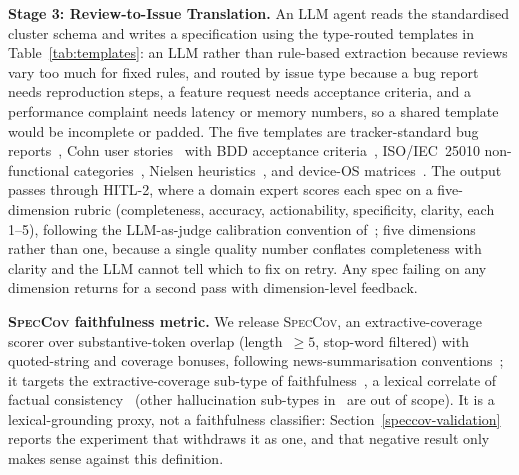 \documentclass[preprint,12pt]{elsarticle}
\begin{document}
  \textbf{Stage 3: Review-to-Issue Translation.} An LLM agent reads the standardised cluster
  schema and writes a specification using the type-routed templates in
  Table~\ref{tab:templates}: an LLM rather than rule-based extraction because reviews vary too
  much for fixed rules, and routed by issue type because a bug report needs reproduction steps, a
  feature request needs acceptance criteria, and a performance complaint needs latency or memory
  numbers, so a shared template would be incomplete or padded. The five templates are
  tracker-standard bug
  reports~\cite{zimmermann2010makes}, Cohn user stories~\cite{cohn2004user} with BDD acceptance
  criteria~\cite{hellesoy2017cucumber}, ISO/IEC~25010 non-functional
  categories~\cite{international2011systems}, Nielsen heuristics~\cite{nielsen1994usability}, and
  device-OS matrices~\cite{joorabchi2013real}. The output passes through HITL-2, where a domain
  expert scores each spec on a five-dimension rubric (completeness, accuracy, actionability,
  specificity, clarity, each 1--5), following the LLM-as-judge calibration convention
  of~\cite{gilardi2023chatgpt, pangakis2023automated, zheng2023judging}; five dimensions rather
  than one, because a single quality number conflates completeness with clarity and the LLM cannot
  tell which to fix on retry. Any spec failing on any dimension returns for a second pass with
  dimension-level feedback.

\textbf{\textsc{SpecCov} faithfulness metric.} We release \textsc{SpecCov}, an extractive-coverage
scorer over substantive-token overlap (length~$\geq 5$, stop-word filtered) with quoted-string and
coverage bonuses, following news-summarisation conventions~\cite{grusky2018newsroom}; it targets
the extractive-coverage sub-type of faithfulness~\cite{maynez2020faithfulness}, a lexical
correlate of factual consistency~\cite{kryscinski2020evaluating} (other hallucination sub-types
in~\cite{ji2023survey} are out of scope). It is a lexical-grounding proxy, not a faithfulness
classifier: Section~\ref{speccov-validation} reports the experiment that withdraws it as one, and
that negative result only makes sense against this definition.
\end{document}
